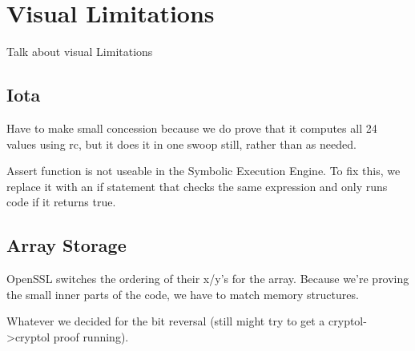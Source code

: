 \section{Visual Limitations}\label{sec:visual}
Talk about visual Limitations
\subsection{Iota}
Have to make small concession because we do prove that it computes all 24 values using rc, but it does it in one swoop still, rather than as needed.

Assert function is not useable in the Symbolic Execution Engine.
To fix this, we replace it with an if statement that checks the same expression and only runs code if it returns true.
\subsection{Array Storage}
OpenSSL switches the ordering of their x/y's for the array.
Because we're proving the small inner parts of the code, we have to match memory structures.

Whatever we decided for the bit reversal (still might try to get a cryptol->cryptol proof running).